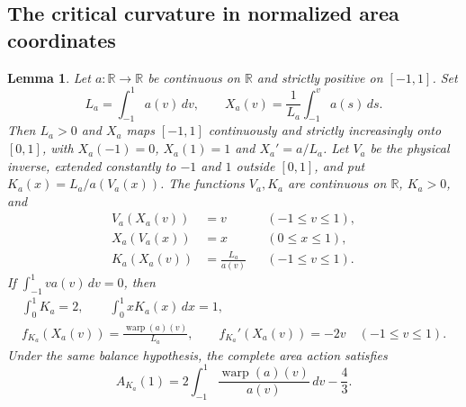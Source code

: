 \documentclass[11pt]{article}
\newtheorem{lemma}[theorem]{Lemma}
\newcommand{\R}{\mathbb R}
\begin{document}
\subsection{The critical curvature in normalized area coordinates}

\begin{lemma}\label{lem:reciprocal-area-coordinate}
Let $a:\R\to\R$ be continuous on $\R$ and strictly positive on $[-1,1]$. Set
\[
 L_a=\int_{-1}^1a(v)\,dv,\qquad
 X_a(v)=\frac1{L_a}\int_{-1}^v a(s)\,ds.
\]
Then $L_a>0$ and $X_a$ maps $[-1,1]$ continuously and strictly increasingly
onto $[0,1]$, with $X_a(-1)=0$, $X_a(1)=1$ and $X_a'=a/L_a$.
Let $V_a$ be the physical inverse, extended constantly to $-1$ and $1$
outside $[0,1]$, and put $K_a(x)=L_a/a(V_a(x))$.
The functions $V_a,K_a$ are continuous on $\R$, $K_a>0$, and
\[
 \begin{aligned}
 V_a(X_a(v))&=v&&(-1\le v\le1),\\
 X_a(V_a(x))&=x&&(0\le x\le1),\\
 K_a(X_a(v))&=\frac{L_a}{a(v)}&&(-1\le v\le1).
 \end{aligned}
\]
If $\int_{-1}^1va(v)\,dv=0$, then
\begin{equation}\label{eq:reciprocal-area-moments-warp}
 \begin{gathered}
 \int_0^1K_a=2,\qquad \int_0^1xK_a(x)\,dx=1,\\
 f_{K_a}(X_a(v))=\frac{\operatorname{warp}(a)(v)}{L_a},\qquad
 f_{K_a}'(X_a(v))=-2v\quad(-1\le v\le1).
 \end{gathered}
\end{equation}
Under the same balance hypothesis, the complete area action satisfies
\begin{equation}\label{eq:reciprocal-area-unit-action}
 A_{K_a}(1)=2\int_{-1}^1\frac{\operatorname{warp}(a)(v)}{a(v)}\,dv-\frac43.
\end{equation}
\end{lemma}
\end{document}
